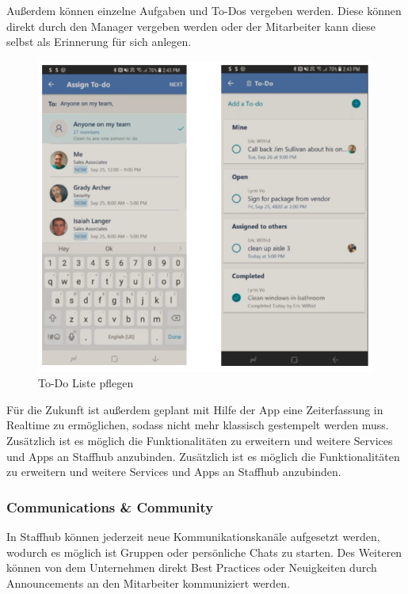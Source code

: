 Außerdem können einzelne Aufgaben und To-Dos vergeben werden. Diese können direkt durch den Manager vergeben werden oder der Mitarbeiter kann diese selbst als Erinnerung für sich anlegen. 

\begin{figure}[H] 
\centering 
\includegraphics[scale=0.78]{images/todolist} 
\caption[To-Do Liste pflegen]{To-Do Liste pflegen\protect} 
\label{ws} 
\end{figure}

Für die Zukunft ist außerdem geplant mit Hilfe der App eine Zeiterfassung in Realtime zu ermöglichen, sodass nicht mehr klassisch gestempelt werden muss.
Zusätzlich ist es möglich die Funktionalitäten zu erweitern und weitere Services und Apps an Staffhub anzubinden. Zusätzlich ist es möglich die Funktionalitäten zu erweitern und weitere Services und Apps an Staffhub anzubinden.

\subsubsection{Communications \& Community}

In Staffhub können jederzeit neue Kommunikationskanäle aufgesetzt werden, wodurch es möglich ist Gruppen oder persönliche Chats zu starten. Des Weiteren können von dem Unternehmen direkt Best Practices oder Neuigkeiten durch Announcements an den Mitarbeiter kommuniziert werden.

